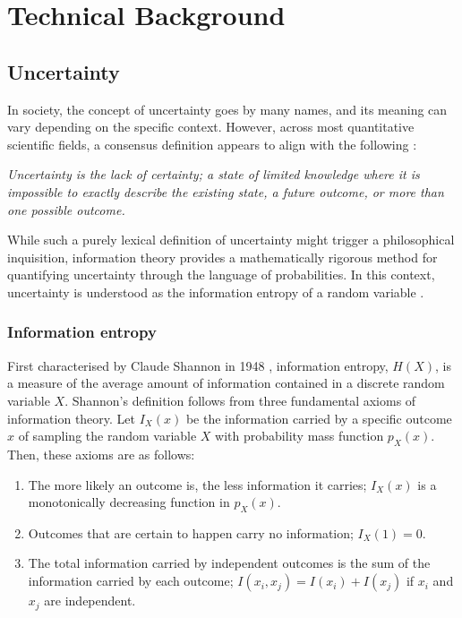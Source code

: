 

\chapter[technical background]{Technical Background}\label{chp:technical-background}

\section{Uncertainty}


In society, the concept of uncertainty goes by many names, and its meaning can vary depending on the specific context. However, across most quantitative scientific fields, a consensus definition appears to align with the following \cite{hubbard_how_2014}:

\begin{center}
    \textit{Uncertainty is the lack of certainty; a state of limited knowledge where it is impossible to exactly describe the existing state, a future outcome, or more than one possible outcome.}
\end{center}

While such a purely lexical definition of uncertainty might trigger a philosophical inquisition, information theory provides a mathematically rigorous method for quantifying uncertainty through the language of probabilities. 
In this context, uncertainty is understood as the information entropy of a random variable \cite{mackay_information_2003}. 


\subsection{Information entropy}
First characterised by Claude Shannon in 1948 \cite{shannon_mathematical_1948}, information entropy, $H(X)$, is a measure of the average amount of information contained in a discrete random variable $X$. Shannon's definition follows from three fundamental axioms of information theory. Let $I_X(x)$ be the information carried by a specific outcome $x$ of sampling the random variable $X$ with probability mass function $p_X(x)$. Then, these axioms are as follows:
\begin{enumerate}[label=(\Roman*)]
    \item The more likely an outcome is, the less information it carries; $I_X(x)$ is a monotonically decreasing function in $p_X(x)$.
    \item Outcomes that are certain to happen carry no information; $I_X(1) = 0$.
    \item The total information carried by independent outcomes is the sum of the information carried by each outcome; $I(x_i, x_j) = I(x_i) + I(x_j)$ if $x_i$ and $x_j$ are independent. 
\end{enumerate}

